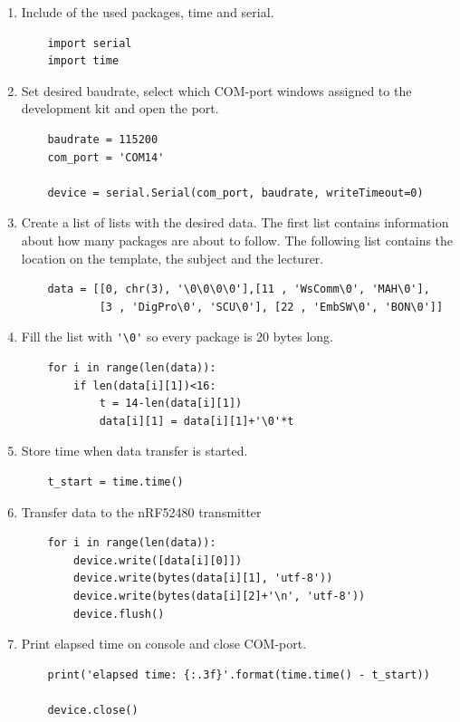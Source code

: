 \begin{enumerate}
	\item Include of the used packages, time and serial.
	\begin{lstlisting}
	import serial
	import time
	\end{lstlisting}	
	\item Set desired baudrate, select which COM-port windows assigned to the development kit and open the port.
	\begin{lstlisting}
	baudrate = 115200
	com_port = 'COM14'
	
	device = serial.Serial(com_port, baudrate, writeTimeout=0)
	\end{lstlisting}
	\item Create a list of lists with the desired data.
	The first list contains information about how many packages are about to follow.
	The following list contains the location on the template, the subject and the lecturer.
	\begin{lstlisting}
	data = [[0, chr(3), '\0\0\0\0'],[11 , 'WsComm\0', 'MAH\0'],
			[3 , 'DigPro\0', 'SCU\0'], [22 , 'EmbSW\0', 'BON\0']]
	\end{lstlisting}
	\item Fill the list with \lstinline|'\0'| so every package is 20 bytes long.
	\begin{lstlisting}
	for i in range(len(data)):
		if len(data[i][1])<16:
			t = 14-len(data[i][1])
			data[i][1] = data[i][1]+'\0'*t
	\end{lstlisting}
	\item Store time when data transfer is started.
	\begin{lstlisting}
	t_start = time.time()
	\end{lstlisting}
	\item Transfer data to the nRF52480 transmitter
	\begin{lstlisting}
	for i in range(len(data)):
		device.write([data[i][0]]) 
		device.write(bytes(data[i][1], 'utf-8'))       
		device.write(bytes(data[i][2]+'\n', 'utf-8'))
		device.flush()
	\end{lstlisting}	
	\item Print elapsed time on console and close COM-port.
	\begin{lstlisting}
	print('elapsed time: {:.3f}'.format(time.time() - t_start))
	
	device.close()
	\end{lstlisting}
	
\end{enumerate}